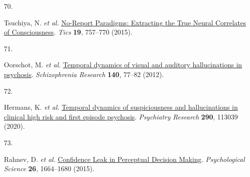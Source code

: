 \documentclass[
]{article}
\newlength{\cslhangindent}
\newlength{\csllabelwidth}
\newenvironment{CSLReferences}[2] %
 {\begin{list}{}{%
  \setlength{\itemindent}{0pt}
  \setlength{\leftmargin}{0pt}
  \setlength{\parsep}{0pt}
  \ifodd #1
   \setlength{\leftmargin}{\cslhangindent}
   \setlength{\itemindent}{-1\cslhangindent}
  \fi
  \setlength{\itemsep}{#2\baselineskip}}}
 {\end{list}}
\newcommand{\CSLLeftMargin}[1]{\parbox[t]{\csllabelwidth}{\strut#1\strut}}
\newcommand{\CSLRightInline}[1]{\parbox[t]{\linewidth - \csllabelwidth}{\strut#1\strut}}
\begin{document}
\begin{CSLReferences}{0}{0}
\CSLLeftMargin{70. }%
\CSLRightInline{Tsuchiya, N. \emph{et al.}
\href{https://doi.org/10.1016/j.tics.2015.10.002}{No-{Report}
{Paradigms}: {Extracting} the {True} {Neural} {Correlates} of
{Consciousness}}. \emph{Tics} \textbf{19}, 757--770 (2015).}

\CSLLeftMargin{71. }%
\CSLRightInline{Oorschot, M. \emph{et al.}
\href{https://doi.org/10.1016/j.schres.2012.06.010}{Temporal dynamics of
visual and auditory hallucinations in psychosis}. \emph{Schizophrenia
Research} \textbf{140}, 77--82 (2012).}

\CSLLeftMargin{72. }%
\CSLRightInline{Hermans, K. \emph{et al.}
\href{https://doi.org/10.1016/j.psychres.2020.113039}{Temporal dynamics
of suspiciousness and hallucinations in clinical high risk and first
episode psychosis}. \emph{Psychiatry Research} \textbf{290}, 113039
(2020).}

\CSLLeftMargin{73. }%
\CSLRightInline{Rahnev, D. \emph{et al.}
\href{https://doi.org/10.1177/0956797615595037}{Confidence {Leak} in
{Perceptual} {Decision} {Making}}. \emph{Psychological Science}
\textbf{26}, 1664--1680 (2015).}

\end{CSLReferences}
\end{document}
